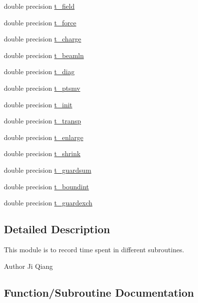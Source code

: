 \begin{DoxyCompactItemize}
\item 
double precision \mbox{\hyperlink{namespacetimerclass_a17175fbcc799b0ea8174c970b128e1b5}{t\+\_\+field}}
\item 
double precision \mbox{\hyperlink{namespacetimerclass_accf4dcea0dd48030e848ec7af2f1e30c}{t\+\_\+force}}
\item 
double precision \mbox{\hyperlink{namespacetimerclass_a3c92f057232df785c821c8340801e508}{t\+\_\+charge}}
\item 
double precision \mbox{\hyperlink{namespacetimerclass_a3dea6c858addd80b0f3ffa23635e58ee}{t\+\_\+beamln}}
\item 
double precision \mbox{\hyperlink{namespacetimerclass_a014cdbd0d72a928c7d6307b246671522}{t\+\_\+diag}}
\item 
double precision \mbox{\hyperlink{namespacetimerclass_ad87bfd792cca542e63e5888518d15f74}{t\+\_\+ptsmv}}
\item 
double precision \mbox{\hyperlink{namespacetimerclass_ac02821c26e6c5b8fe3ce7df142bedd47}{t\+\_\+init}}
\item 
double precision \mbox{\hyperlink{namespacetimerclass_a6ada82fea692f0dbd703888ffbd44214}{t\+\_\+transp}}
\item 
double precision \mbox{\hyperlink{namespacetimerclass_a95e3a3f478de91de1ebd380edef137ae}{t\+\_\+enlarge}}
\item 
double precision \mbox{\hyperlink{namespacetimerclass_a78620c6678e30a2cd4796a31b2f718ff}{t\+\_\+shrink}}
\item 
double precision \mbox{\hyperlink{namespacetimerclass_abfb4952ad8c64a2985930df8e27025de}{t\+\_\+guardsum}}
\item 
double precision \mbox{\hyperlink{namespacetimerclass_ad0e0d8ccf1da4567018453934b6c5795}{t\+\_\+boundint}}
\item 
double precision \mbox{\hyperlink{namespacetimerclass_a555d18ed5df532a56a58498c3915a778}{t\+\_\+guardexch}}
\end{DoxyCompactItemize}


\subsection{Detailed Description}
This module is to record time spent in different subroutines. 

\begin{DoxyAuthor}{Author}
Ji Qiang 
\end{DoxyAuthor}


\subsection{Function/\+Subroutine Documentation}
\mbox{\label{namespacetimerclass_a162c9c59b952268a3b7b544cff4f4295}} 
